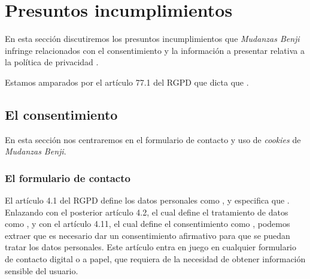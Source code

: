 \section{Presuntos incumplimientos}
En esta sección discutiremos los presuntos incumplimientos que \textit{Mudanzas Benji} infringe relacionados con el consentimiento y la información a presentar relativa a la política de privacidad  \cite{benjiprivacidad}.

Estamos amparados por el artículo 77.1 del RGPD que dicta que .


\subsection{El consentimiento}
En esta sección nos centraremos en el formulario de contacto y uso de \textit{cookies} de \textit{Mudanzas Benji}.

\newpage
\subsubsection{El formulario de contacto}
El artículo 4.1 del RGPD define los datos personales como , y especifica que . Enlazando con el posterior artículo 4.2, el cual define el tratamiento de datos como , y con el artículo 4.11, el cual define el consentimiento como , podemos extraer que es necesario dar un consentimiento afirmativo para que se puedan tratar los datos personales. Este artículo entra en juego en cualquier formulario de contacto digital o a papel, que requiera de la necesidad de obtener información sensible del usuario.


